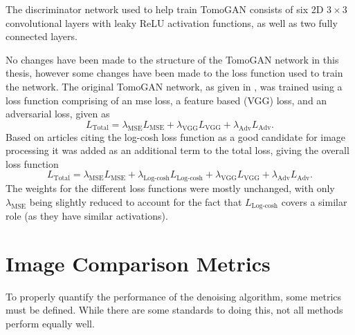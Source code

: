 
The discriminator network used to help train TomoGAN consists of six 2D $3\times3$ convolutional layers with leaky ReLU activation functions, as well as two fully connected layers. 

No changes have been made to the structure of the TomoGAN network in this thesis, however some changes have been made to the loss function used to train the network. The original TomoGAN network, as given in \cite{liu2020tomogan}, was trained using a loss function comprising of an \acrshort{mse} loss, a feature based (VGG) loss, and an adversarial loss, given as 
\begin{equation}
    L_{\text{Total}} = \lambda_{\text{MSE}}L_{\text{MSE}} + \lambda_{\text{VGG}}L_{\text{VGG}} + \lambda_{\text{Adv}}L_{\text{Adv}}.
\end{equation}
Based on articles citing the log-cosh loss function as a good candidate for image processing \cite{7797130,chen2019log} it was added as an additional term to the total loss, giving the overall loss function
\begin{equation}
    L_{\text{Total}} = \lambda_{\text{MSE}}L_{\text{MSE}} + \lambda_{\text{Log-cosh}}L_{\text{Log-cosh}} + \lambda_{\text{VGG}}L_{\text{VGG}} + \lambda_{\text{Adv}}L_{\text{Adv}}.
\end{equation}
The weights for the different loss functions were mostly unchanged, with only $\lambda_\text{MSE}$ being slightly reduced to account for the fact that $L_\text{Log-cosh}$ covers a similar role (as they have similar activations). 

\section{Image Comparison Metrics}
\label{sec:method:metrics}
To properly quantify the performance of the denoising algorithm, some metrics must be defined. While there are some standards to doing this, not all methods perform equally well. 

